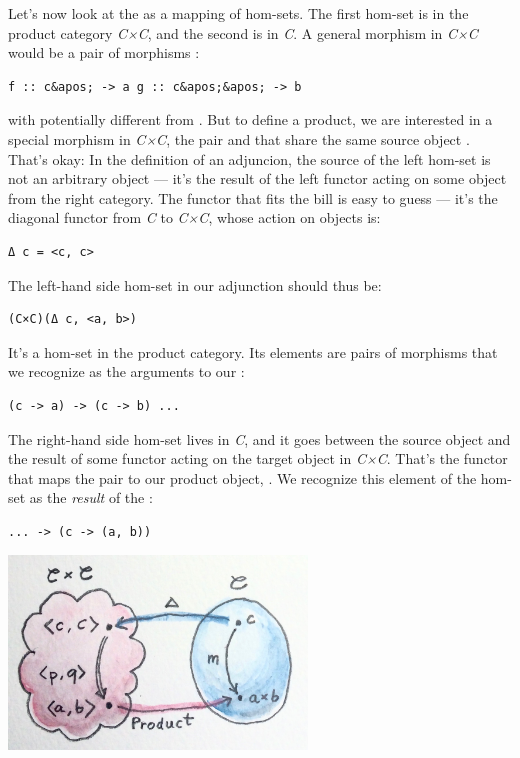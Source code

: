 Let's now look at the  as a mapping of hom-sets. The
first hom-set is in the product category \emph{C×C}, and the second is
in \emph{C}. A general morphism in \emph{C×C} would be a pair of
morphisms :

\begin{verbatim}
f :: c&apos; -> a g :: c&apos;&apos; -> b
\end{verbatim}

with  potentially different from
. But to define a product, we are interested in a
special morphism in \emph{C×C}, the pair  and  that
share the same source object . That's okay: In the definition
of an adjuncion, the source of the left hom-set is not an arbitrary
object --- it's the result of the left functor  acting on some
object from the right category. The functor that fits the bill is easy
to guess --- it's the diagonal functor from \emph{C} to \emph{C×C},
whose action on objects is:

\begin{verbatim}
Δ c = <c, c>
\end{verbatim}

The left-hand side hom-set in our adjunction should thus be:

\begin{verbatim}
(C×C)(Δ c, <a, b>)
\end{verbatim}

It's a hom-set in the product category. Its elements are pairs of
morphisms that we recognize as the arguments to our :

\begin{verbatim}
(c -> a) -> (c -> b) ...
\end{verbatim}

The right-hand side hom-set lives in \emph{C}, and it goes between the
source object  and the result of some functor 
acting on the target object in \emph{C×C}. That's the functor that maps
the pair  to our product object,
. We recognize this element of the hom-set as the
\emph{result} of the :

\begin{verbatim}
... -> (c -> (a, b))
\end{verbatim}

\includegraphics[width=3.12500in]{images/adj-product.jpg}

